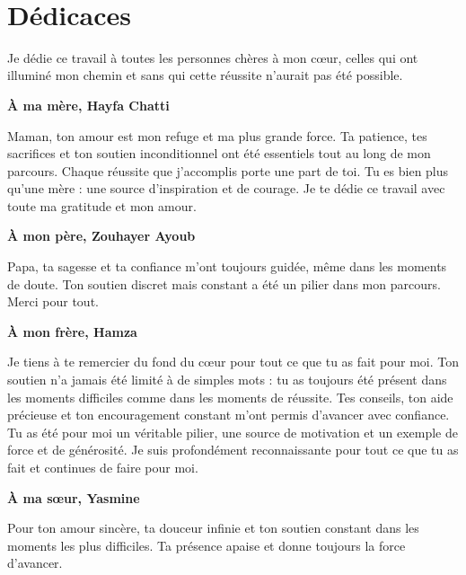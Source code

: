 ﻿﻿\chapter*{Dédicaces}
Je dédie ce travail à toutes les personnes chères à mon cœur, celles qui ont illuminé mon chemin et sans qui cette réussite n'aurait pas été possible.\\ 

{\centering
\textbf{\large À ma mère, Hayfa Chatti}\par
}

Maman, ton amour est mon refuge et ma plus grande force. Ta patience, tes sacrifices et ton soutien inconditionnel ont été essentiels tout au long de mon parcours. Chaque réussite que j'accomplis porte une part de toi. Tu es bien plus qu'une mère : une source d'inspiration et de courage. Je te dédie ce travail avec toute ma gratitude et mon amour.



\vspace{0.5cm}

{\centering
\textbf{\large À mon père, Zouhayer Ayoub}\par
}

Papa, ta sagesse et ta confiance m'ont toujours guidée, même dans les moments de doute. Ton soutien discret mais constant a été un pilier dans mon parcours. Merci pour tout.



\vspace{0.5cm}

{\centering
\textbf{\large À mon frère, Hamza}\par
}

Je tiens à te remercier du fond du cœur pour tout ce que tu as fait pour moi. Ton soutien n'a jamais été limité à de simples mots : tu as toujours été présent dans les moments difficiles comme dans les moments de réussite. Tes conseils, ton aide précieuse et ton encouragement constant m'ont permis d'avancer avec confiance. Tu as été pour moi un véritable pilier, une source de motivation et un exemple de force et de générosité. Je suis profondément reconnaissante pour tout ce que tu as fait et continues de faire pour moi.

\vspace{0.3cm}

{\centering
\textbf{\large À ma sœur, Yasmine}\par
}

Pour ton amour sincère, ta douceur infinie et ton soutien constant dans les moments les plus difficiles. Ta présence apaise et donne toujours la force d'avancer.

